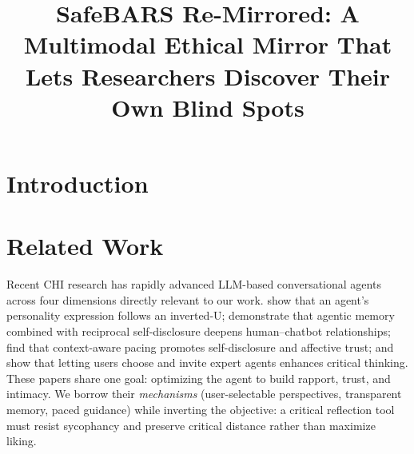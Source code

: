 \documentclass[manuscript,screen]{acmart}
\title{SafeBARS Re-Mirrored: A Multimodal Ethical Mirror That Lets Researchers
Discover Their Own Blind Spots}
\begin{document}
\maketitle

\section{Introduction}

\section{Related Work}
Recent CHI research has rapidly advanced LLM-based conversational agents across four
dimensions directly relevant to our work. \citep{vibecheck26} show that an agent's
personality expression follows an inverted-U; \citep{recallbot26} demonstrate that
agentic memory combined with reciprocal self-disclosure deepens human--chatbot
relationships; \citep{hearinsilence26} find that context-aware pacing promotes
self-disclosure and affective trust; and \citep{perspectra26} show that letting users
choose and invite expert agents enhances critical thinking. These papers share one
goal: optimizing the agent to build rapport, trust, and intimacy. We borrow their
\emph{mechanisms} (user-selectable perspectives, transparent memory, paced guidance)
while inverting the objective: a critical reflection tool must resist sycophancy and
preserve critical distance rather than maximize liking.
\end{document}
